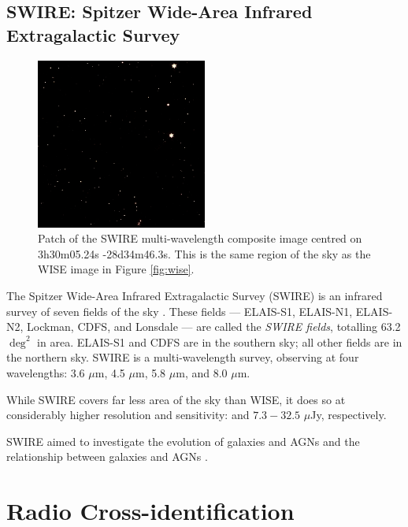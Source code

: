         \subsection{SWIRE: Spitzer Wide-Area Infrared Extragalactic Survey}
        \label{sec:swire}

            \begin{figure}[!ht]
                \centering
                \includegraphics[width=0.5\textwidth]{images/swire_small.jpg}
                \caption{Patch of the SWIRE multi-wavelength composite image
                    centred on 3h30m05.24s -28d34m46.3s. This is the same region
                    of the sky as the WISE image in Figure \ref{fig:wise}.}
            \end{figure}

            The Spitzer Wide-Area Infrared Extragalactic Survey (SWIRE) is an
            infrared survey of seven fields of the sky
            \citep{lonsdale03}. These fields --- ELAIS-S1, ELAIS-N1, ELAIS-N2,
            Lockman, CDFS, and Lonsdale --- are called the \emph{SWIRE fields},
            totalling 63.2 $\deg^2$ in area. ELAIS-S1 and CDFS are in the
            southern sky; all other fields are in the northern sky. SWIRE is a
            multi-wavelength survey, observing at four wavelengths: 3.6 $\mu$m,
            4.5 $\mu$m, 5.8 $\mu$m, and 8.0 $\mu$m.

            While SWIRE covers far less area of the sky than WISE, it does so at
            considerably higher resolution and sensitivity:  and $7.3 - 32.5$ $\mu$Jy, respectively.

            SWIRE aimed to investigate the evolution of galaxies and AGNs and
            the relationship between galaxies and AGNs \citep{surace05}.

    \section{Radio Cross-identification}
    \label{sec:radio-cross-identification}

